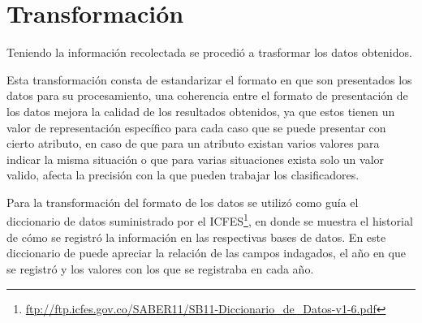 \section{Transformación}
Teniendo la información recolectada se procedió a trasformar los datos obtenidos.

Esta transformación consta de estandarizar el formato en que son presentados los datos para su procesamiento, una coherencia entre el formato de presentación de los datos mejora la calidad de los resultados obtenidos, ya que estos tienen un valor de representación específico para cada caso que se puede presentar con cierto atributo, en caso de que para un atributo existan varios valores para indicar la misma situación o que para varias situaciones exista solo un valor valido, afecta la precisión con la que pueden trabajar los clasificadores.

Para la transformación del formato de los datos se utilizó como guía el diccionario de datos suministrado por el ICFES\footnote{\url{ftp://ftp.icfes.gov.co/SABER11/SB11-Diccionario_de_Datos-v1-6.pdf}}, en donde se muestra el historial de cómo se registró la información en las respectivas bases de datos. En este diccionario de puede apreciar la relación de las campos indagados, el año en que se registró y los valores con los que se registraba en cada año.

